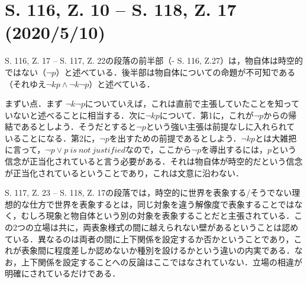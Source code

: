 \documentclass[12pt]{jsarticle}
\begin{document}
\section{S. 116, Z. 10 -- S. 118, Z. 17 (2020/5/10)}

S. 116, Z. 17 -- S. 117, Z. 22の段落の前半部（- S. 116, Z.27）は，物自体は時空的ではない（$\lnot p$）と述べている．後半部は物自体についての命題が不可知である（それゆえ$\lnot k p \land \lnot k \lnot p$）と述べている．

まずい点．まず $\lnot k \lnot p$についていえば，これは直前で主張していたことを知っていないと述べることに相当する．次に$\lnot k p$について．第1に，これが$\lnot p$からの帰結であるとしよう．そうだとすると$\lnot p$という強い主張は前提なしに入れられていることになる．第2に，$\lnot p$を出すための前提であるとしよう．$\lnot k p$とは大雑把に言って，$\lnot p \lor p\ is\ not\ justified$なので，ここから$\lnot  p$を導出するには，$p$という信念が正当化されていると言う必要がある．それは物自体が時空的だという信念が正当化されているということであり，これは文意に沿わない．

S. 117, Z. 23 -- S. 118, Z. 17の段落では，時空的に世界を表象する/そうでない理想的な仕方で世界を表象するとは，同じ対象を違う解像度で表象することではなく，むしろ現象と物自体という別の対象を表象することだと主張されている．この2つの立場は共に，両表象様式の間に越えられない壁があるということは認めている．異なるのは両者の間に上下関係を設定するか否かということであり，これが表象間に程度差しか認めないか種別を設けるかという違いの内実である．なお，上下関係を設定することへの反論はここではなされていない．立場の相違が明確にされているだけである．
\end{document}
